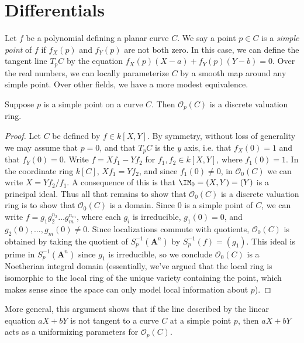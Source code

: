 \section{Differentials}

Let $f$ be a polynomial defining a planar curve $C$. We say a point $p \in C$ is a \emph{simple point} of $f$ if $f_X(p)$ and $f_Y(p)$ are not both zero. In this case, we can define the tangent line $T_p C$ by the equation $f_X(p) (X - a) + f_Y(p) (Y - b) = 0$. Over the real numbers, we can locally parameterize $C$ by a smooth map around any simple point. Over other fields, we have a more modest equivalence.

\begin{theorem}
    Suppose $p$ is a simple point on a curve $C$. Then $\mathcal{O}_p(C)$ is a discrete valuation ring.
\end{theorem}
\begin{proof}
    Let $C$ be defined by $f \in k[X,Y]$. By symmetry, without loss of generality we may assume that $p = 0$, and that $T_p C$ is the $y$ axis, i.e. that $f_X(0) = 1$ and that $f_Y(0) = 0$. Write $f = X f_1 - Y f_2$ for $f_1,f_2 \in k[X,Y]$, where $f_1(0) = 1$. In the coordinate ring $k[C]$, $X f_1 = Y f_2$, and since $f_1(0) \neq 0$, in $\mathcal{O}_0(C)$ we can write $X = Y f_2 / f_1$. A consequence of this is that $\IM_0 = (X,Y) = (Y)$ is a principal ideal. Thus all that remains to show that $\mathcal{O}_0(C)$ is a discrete valuation ring is to show that $\mathcal{O}_0(C)$ is a domain. Since $0$ is a simple point of $C$, we can write $f = g_1 g_2^{n_2} \dots g_m^{n_m}$, where each $g_i$ is irreducible, $g_1(0) = 0$, and $g_2(0),\dots,g_m(0) \neq 0$. Since localizations commute with quotients, $\mathcal{O}_0(C)$ is obtained by taking the quotient of $S_p^{-1}(\mathbf{A}^n)$ by $S_p^{-1} (f) = (g_1)$. This ideal is prime in $S_p^{-1}(\mathbf{A}^n)$ since $g_1$ is irreducible, so we conclude $\mathcal{O}_0(C)$ is a Noetherian integral domain (essentially, we've argued that the local ring is isomorphic to the local ring of the unique variety containing the point, which makes sense since the space can only model local information about $p$).
\end{proof}

\begin{remark}
    More general, this argument shows that if the line described by the linear equation $aX + bY$ is not tangent to a curve $C$ at a simple point $p$, then $aX + bY$ acts as a uniformizing parameters for $\mathcal{O}_p(C)$.
\end{remark}

